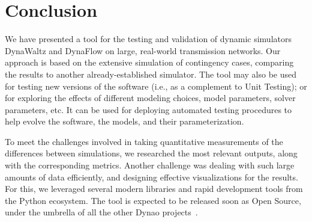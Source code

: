 \documentclass[conference]{IEEEtran}
\newcommand{\Dynawo}{Dyna\textomega o\xspace} %
\begin{document}
\section{Conclusion}

We have presented a tool for the testing and validation of dynamic simulators
DynaWaltz and DynaFlow on large, real-world transmission networks.  Our approach
is based on the extensive simulation of contingency cases, comparing the results
to another already-established simulator. The tool may also be used for testing
new versions of the software (i.e., as a complement to Unit Testing); or for
exploring the effects of different modeling choices, model parameters, solver
parameters, etc.  It can be used for deploying automated testing procedures to
help evolve the software, the models, and their parameterization.

To meet the challenges involved in taking quantitative measurements of the
differences between simulations, we researched the most relevant outputs, along
with the corresponding metrics. Another challenge was dealing with such large
amounts of data efficiently, and designing effective visualizations for the
results. For this, we leveraged several modern libraries and rapid development
tools from the Python ecosystem.  The tool is expected to be released soon as
Open Source, under the umbrella of all the other \Dynawo
projects~\cite{DwoGitRepos}.









\end{document}
